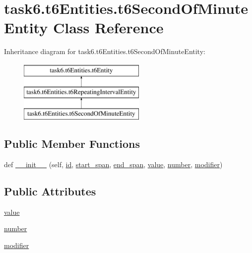 \hypertarget{classtask6_1_1t6Entities_1_1t6SecondOfMinuteEntity}{}\section{task6.\+t6\+Entities.\+t6\+Second\+Of\+Minute\+Entity Class Reference}
\label{classtask6_1_1t6Entities_1_1t6SecondOfMinuteEntity}
Inheritance diagram for task6.\+t6\+Entities.\+t6\+Second\+Of\+Minute\+Entity\+:\begin{figure}[H]
\begin{center}
\leavevmode
\includegraphics[height=3.000000cm]{classtask6_1_1t6Entities_1_1t6SecondOfMinuteEntity}
\end{center}
\end{figure}
\subsection*{Public Member Functions}
\begin{DoxyCompactItemize}
\item 
def \hyperlink{classtask6_1_1t6Entities_1_1t6SecondOfMinuteEntity_a72df3a7fc0f012f47a9ef4e59b37d8d8}{\+\_\+\+\_\+init\+\_\+\+\_\+} (self, \hyperlink{classtask6_1_1t6Entities_1_1t6Entity_a96b2e7fb553c920ab2db6f6deb31e3b4}{id}, \hyperlink{classtask6_1_1t6Entities_1_1t6Entity_a8221c36d2995a24200cdfbd74cc9233c}{start\+\_\+span}, \hyperlink{classtask6_1_1t6Entities_1_1t6Entity_a597d42bb02fc9f42277098f0ce21917c}{end\+\_\+span}, \hyperlink{classtask6_1_1t6Entities_1_1t6SecondOfMinuteEntity_aff727a881d0f17db4d1fd6855a1a6bef}{value}, \hyperlink{classtask6_1_1t6Entities_1_1t6SecondOfMinuteEntity_a48c9a62b4b48c7305de6cfa415b55314}{number}, \hyperlink{classtask6_1_1t6Entities_1_1t6SecondOfMinuteEntity_a4a391bc1044be003048f603c957c1acb}{modifier})
\end{DoxyCompactItemize}
\subsection*{Public Attributes}
\begin{DoxyCompactItemize}
\item 
\hyperlink{classtask6_1_1t6Entities_1_1t6SecondOfMinuteEntity_aff727a881d0f17db4d1fd6855a1a6bef}{value}
\item 
\hyperlink{classtask6_1_1t6Entities_1_1t6SecondOfMinuteEntity_a48c9a62b4b48c7305de6cfa415b55314}{number}
\item 
\hyperlink{classtask6_1_1t6Entities_1_1t6SecondOfMinuteEntity_a4a391bc1044be003048f603c957c1acb}{modifier}
\end{DoxyCompactItemize}


